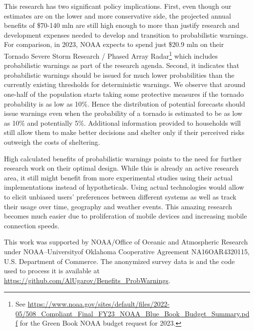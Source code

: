 \documentclass{ametsocV6.1}
\begin{document}
This research has two significant policy implications. First, even though our estimates are on the lower and more conservative side, the projected annual benefits of \$70-140 mln are still high enough to more than justify research and development expenses needed to develop and transition to probabilistic warnings. For comparison, in 2023, NOAA expects to spend just \$20.9 mln on their Tornado Severe Storm Research / Phased Array Radar\footnote{See \url{https://www.noaa.gov/sites/default/files/2022-05/508_Compliant_Final_FY23_NOAA_Blue_Book_Budget_Summary.pdf} for the Green Book NOAA budget request for 2023.} which includes probabilistic warnings as part of the research agenda. Second, it indicates that probabilistic warnings should be issued for much lower probabilities than the currently existing thresholds for deterministic warnings. We observe that around one-half of the population starts taking some protective measures if the tornado probability is as low as 10\%. Hence the distribution of potential forecasts should issue warnings even when the probability of a tornado is estimated to be as low as 10\% and potentially 5\%. Additional information provided to households will still allow them to make better decisions and shelter only if their perceived risks outweigh the costs of sheltering.

High calculated benefits of probabilistic warnings points to the need for further research work on their optimal design. While this is already an active research area, it still might benefit from more experimental studies using their actual implementations instead of hypotheticals. Using actual technologies would allow to elicit unbiased users' preferences between different systems as well as track their usage over time, geography and weather events. This amazing research becomes much easier due to proliferation of mobile devices and increasing mobile connection speeds.

\newpage


\clearpage
\acknowledgments
This work was supported by NOAA/Office of Oceanic and Atmospheric Research under NOAA–Universityof Oklahoma Cooperative Agreement NA16OAR4320115, U.S.
Department of Commerce.
% 
%
\datastatement
The anonymized survey data is and the code used to process it is available at \url{https://github.com/AlUgarov/Benefits_ProbWarnings}.
\end{document}

